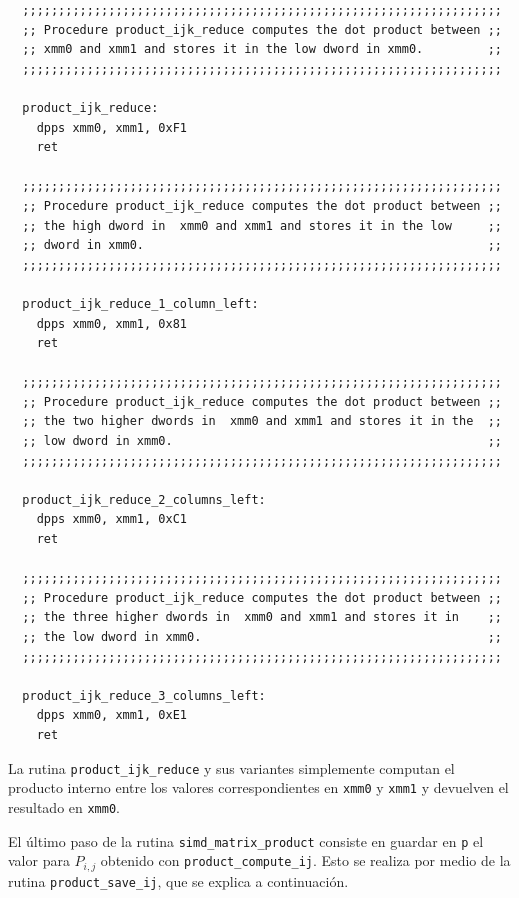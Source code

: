 \documentclass[a4paper, 10pt, twoside]{article}
\newcommand{\cc}[1]{\texttt{#1}}
\begin{document}
\begin{verbatim}
  ;;;;;;;;;;;;;;;;;;;;;;;;;;;;;;;;;;;;;;;;;;;;;;;;;;;;;;;;;;;;;;;;;;;
  ;; Procedure product_ijk_reduce computes the dot product between ;;
  ;; xmm0 and xmm1 and stores it in the low dword in xmm0.         ;;
  ;;;;;;;;;;;;;;;;;;;;;;;;;;;;;;;;;;;;;;;;;;;;;;;;;;;;;;;;;;;;;;;;;;;

  product_ijk_reduce:
    dpps xmm0, xmm1, 0xF1
    ret

  ;;;;;;;;;;;;;;;;;;;;;;;;;;;;;;;;;;;;;;;;;;;;;;;;;;;;;;;;;;;;;;;;;;;
  ;; Procedure product_ijk_reduce computes the dot product between ;;
  ;; the high dword in  xmm0 and xmm1 and stores it in the low     ;;
  ;; dword in xmm0.                                                ;;
  ;;;;;;;;;;;;;;;;;;;;;;;;;;;;;;;;;;;;;;;;;;;;;;;;;;;;;;;;;;;;;;;;;;;

  product_ijk_reduce_1_column_left:
    dpps xmm0, xmm1, 0x81
    ret

  ;;;;;;;;;;;;;;;;;;;;;;;;;;;;;;;;;;;;;;;;;;;;;;;;;;;;;;;;;;;;;;;;;;;
  ;; Procedure product_ijk_reduce computes the dot product between ;;
  ;; the two higher dwords in  xmm0 and xmm1 and stores it in the  ;;
  ;; low dword in xmm0.                                            ;;
  ;;;;;;;;;;;;;;;;;;;;;;;;;;;;;;;;;;;;;;;;;;;;;;;;;;;;;;;;;;;;;;;;;;;

  product_ijk_reduce_2_columns_left:
    dpps xmm0, xmm1, 0xC1
    ret

  ;;;;;;;;;;;;;;;;;;;;;;;;;;;;;;;;;;;;;;;;;;;;;;;;;;;;;;;;;;;;;;;;;;;
  ;; Procedure product_ijk_reduce computes the dot product between ;;
  ;; the three higher dwords in  xmm0 and xmm1 and stores it in    ;;
  ;; the low dword in xmm0.                                        ;;
  ;;;;;;;;;;;;;;;;;;;;;;;;;;;;;;;;;;;;;;;;;;;;;;;;;;;;;;;;;;;;;;;;;;;

  product_ijk_reduce_3_columns_left:
    dpps xmm0, xmm1, 0xE1
    ret
\end{verbatim}

La rutina \cc{product\_ijk\_reduce} y sus variantes simplemente computan el
producto interno entre los valores correspondientes en \cc{xmm0} y \cc{xmm1} y
devuelven el resultado en \cc{xmm0}.

El último paso de la rutina \cc{simd\_matrix\_product} consiste en guardar en
\cc{p} el valor para $P_{i,j}$ obtenido con \cc{product\_compute\_ij}. Esto se
realiza por medio de la rutina \cc{product\_save\_ij}, que se explica a
continuación.
\end{document}
